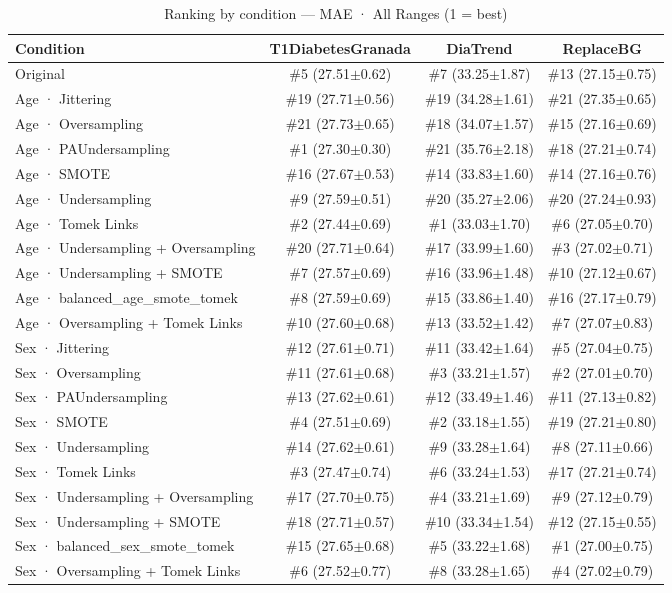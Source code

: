 \begin{table}[htbp]
\centering
\small
\caption{Ranking by condition — MAE · All Ranges  (1 = best)}
\label{tab:ranking_mae_entire}
\begin{tabular}{lccc}
\toprule
\textbf{Condition} & \textbf{T1DiabetesGranada} & \textbf{DiaTrend} & \textbf{ReplaceBG} \\
\midrule
Original & \#5 (27.51$\pm$0.62) & \#7 (33.25$\pm$1.87) & \#13 (27.15$\pm$0.75) \\
Age · Jittering & \#19 (27.71$\pm$0.56) & \#19 (34.28$\pm$1.61) & \#21 (27.35$\pm$0.65) \\
Age · Oversampling & \#21 (27.73$\pm$0.65) & \#18 (34.07$\pm$1.57) & \#15 (27.16$\pm$0.69) \\
Age · PAUndersampling & \#1 (27.30$\pm$0.30) & \#21 (35.76$\pm$2.18) & \#18 (27.21$\pm$0.74) \\
Age · SMOTE & \#16 (27.67$\pm$0.53) & \#14 (33.83$\pm$1.60) & \#14 (27.16$\pm$0.76) \\
Age · Undersampling & \#9 (27.59$\pm$0.51) & \#20 (35.27$\pm$2.06) & \#20 (27.24$\pm$0.93) \\
Age · Tomek Links & \#2 (27.44$\pm$0.69) & \#1 (33.03$\pm$1.70) & \#6 (27.05$\pm$0.70) \\
Age · Undersampling + Oversampling & \#20 (27.71$\pm$0.64) & \#17 (33.99$\pm$1.60) & \#3 (27.02$\pm$0.71) \\
Age · Undersampling + SMOTE & \#7 (27.57$\pm$0.69) & \#16 (33.96$\pm$1.48) & \#10 (27.12$\pm$0.67) \\
Age · balanced_age_smote_tomek & \#8 (27.59$\pm$0.69) & \#15 (33.86$\pm$1.40) & \#16 (27.17$\pm$0.79) \\
Age · Oversampling + Tomek Links & \#10 (27.60$\pm$0.68) & \#13 (33.52$\pm$1.42) & \#7 (27.07$\pm$0.83) \\
\midrule
Sex · Jittering & \#12 (27.61$\pm$0.71) & \#11 (33.42$\pm$1.64) & \#5 (27.04$\pm$0.75) \\
Sex · Oversampling & \#11 (27.61$\pm$0.68) & \#3 (33.21$\pm$1.57) & \#2 (27.01$\pm$0.70) \\
Sex · PAUndersampling & \#13 (27.62$\pm$0.61) & \#12 (33.49$\pm$1.46) & \#11 (27.13$\pm$0.82) \\
Sex · SMOTE & \#4 (27.51$\pm$0.69) & \#2 (33.18$\pm$1.55) & \#19 (27.21$\pm$0.80) \\
Sex · Undersampling & \#14 (27.62$\pm$0.61) & \#9 (33.28$\pm$1.64) & \#8 (27.11$\pm$0.66) \\
Sex · Tomek Links & \#3 (27.47$\pm$0.74) & \#6 (33.24$\pm$1.53) & \#17 (27.21$\pm$0.74) \\
Sex · Undersampling + Oversampling & \#17 (27.70$\pm$0.75) & \#4 (33.21$\pm$1.69) & \#9 (27.12$\pm$0.79) \\
Sex · Undersampling + SMOTE & \#18 (27.71$\pm$0.57) & \#10 (33.34$\pm$1.54) & \#12 (27.15$\pm$0.55) \\
Sex · balanced_sex_smote_tomek & \#15 (27.65$\pm$0.68) & \#5 (33.22$\pm$1.68) & \#1 (27.00$\pm$0.75) \\
Sex · Oversampling + Tomek Links & \#6 (27.52$\pm$0.77) & \#8 (33.28$\pm$1.65) & \#4 (27.02$\pm$0.79) \\
\bottomrule
\end{tabular}
\end{table}